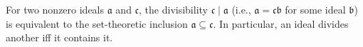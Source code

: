 For two nonzero ideals $\mathfrak{a}$ and $\mathfrak{c}$, the divisibility $\mathfrak{c} \mid \mathfrak{a}$ (i.e., $\mathfrak{a} = \mathfrak{c}\mathfrak{b}$ for some ideal $\mathfrak{b}$) is equivalent to the set-theoretic inclusion $\mathfrak{a} \subseteq \mathfrak{c}$. In particular, an ideal divides another iff it contains it.
